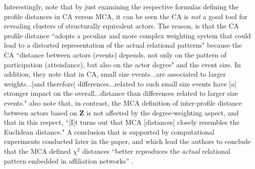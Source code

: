 Interestingly, \citet[115]{desposito2014comparison} note that by just examining the respective formulas defining the profile distances in CA versus MCA, it can be seen the CA is \textit{not} a good tool for revealing clusters of structurally equivalent actors. The reason, is that the CA profile distance ``adopts a peculiar and more complex weighting system that could lead to a distorted representation of the actual relational patterns" because the CA ``distance between actors (events) depends, not only on the pattern of participation (attendance), but also on the actor degree" and the event size. In addition, they note that in CA, small size events...are associated to larger weights...[and therefore] differences...related to such small size events have [a] stronger impact on the overall...distance than differences related to larger size events." \citet{desposito2014comparison} also note that, in contrast, the MCA definition of inter-profile distance between actors based on $\mathbf{Z}$ is not affected by the degree-weighting aspect, and that in this respect, ``[I]t turns out that MCA [distances] closely resembles the Euclidean distance." A conclusion that is supported by computational experiments conducted later in the paper, and which lead the authors to conclude that the MCA defined  $\chi^2$ distances ``better reproduces the \textit{actual} relational pattern embedded in affiliation networks'' \citep[122, italics added]{desposito2014comparison}.
